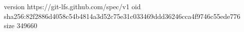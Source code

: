 version https://git-lfs.github.com/spec/v1
oid sha256:82f2886d4058c54b4814a3d52c75e31c033469ddd36246cca4f9746c55ede776
size 349660
